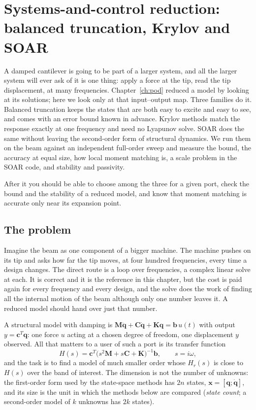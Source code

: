 \chapter{Systems-and-control reduction: balanced truncation, Krylov and SOAR}\label{ch:bt}

\begin{tcolorbox}[colback=hpale,colframe=hnavy!60,coltitle=white,colbacktitle=hnavy!85,title={In this chapter}]
A damped cantilever is going to be part of a larger system, and all the larger system will ever ask of it is one thing: apply a force at the tip, read the tip displacement, at many frequencies. Chapter~\ref{ch:pod} reduced a model by looking at its solutions; here we look only at that input--output map. Three families do it. Balanced truncation keeps the states that are both easy to excite and easy to see, and comes with an error bound known in advance. Krylov methods match the response exactly at one frequency and need no Lyapunov solve. SOAR does the same without leaving the second-order form of structural dynamics. We run them on the beam against an independent full-order sweep and measure the bound, the accuracy at equal size, how local moment matching is, a scale problem in the SOAR code, and stability and passivity.\par\smallskip
After it you should be able to choose among the three for a given port, check the bound and the stability of a reduced model, and know that moment matching is accurate only near its expansion point.
\end{tcolorbox}

\section{The problem}\label{sec:bt-problem}

Imagine the beam as one component of a bigger machine. The machine pushes on its tip and asks how far the tip moves, at four hundred frequencies, every time a design changes. The direct route is a loop over frequencies, a complex linear solve at each. It is correct and it is the reference in this chapter, but the cost is paid again for every frequency and every design, and the solve does the work of finding all the internal motion of the beam although only one number leaves it. A reduced model should hand over just that number.

A structural model with damping is $\bm M\ddot{\bm q}+\bm C\dot{\bm q}+\bm K\bm q=\bm b\,u(t)$ with output $y=\bm c^T\bm q$: one force $u$ acting at a chosen degree of freedom, one displacement $y$ observed. All that matters to a user of such a port is its transfer function
\begin{equation}\label{eq:bt-tf}
H(s)=\bm c^T\bigl(s^2\bm M+s\bm C+\bm K\bigr)^{-1}\bm b,\qquad s=i\omega,
\end{equation}
and the task is to find a model of much smaller order whose $H_r(s)$ is close to $H(s)$ over the band of interest. The dimension is not the number of unknowns: the first-order form used by the state-space methods has $2n$ states, $\bm x=[\bm q;\dot{\bm q}]$, and its size is the unit in which the methods below are compared (\emph{state count}; a second-order model of $k$ unknowns has $2k$ states).

